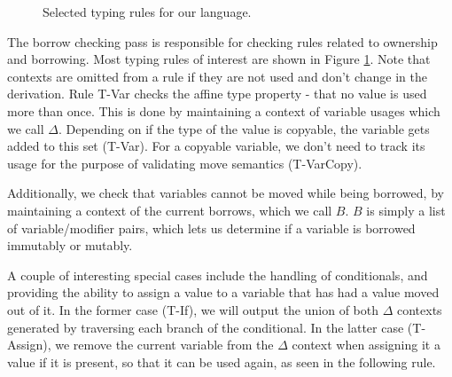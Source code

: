 \documentclass[letterpaper,11pt]{article}
\begin{document}
\begin{figure}
\begin{prooftree}
\end{prooftree}

\begin{prooftree}
\end{prooftree}

    \caption{Selected typing rules for our language.}
    \label{borrowrules}
\end{figure}

The borrow checking pass is responsible for checking rules related to ownership
and borrowing. Most typing rules of interest are shown in Figure \ref{borrowrules}. Note that
contexts are omitted from a rule if they are not used and don't change in the derivation.
Rule T-Var checks the affine type property - that no value is used more than once.
This is done by maintaining a context of variable usages which we call $\Delta$. Depending on if the type
of the value is copyable, the variable gets added to this set (T-Var). For a copyable variable,
we don't need to track its usage for the purpose of validating move semantics (T-VarCopy).

Additionally, we check that variables cannot be moved while being borrowed, by
maintaining a context of the current borrows, which we call $B$. $B$ is simply a list of variable/modifier
pairs, which lets us determine if a variable is borrowed immutably or mutably.

A couple of interesting special cases include the handling of conditionals,
and providing the ability to assign a value to a variable that has had a value
moved out of it. In the former case (T-If), we will output the union of both $\Delta$
contexts generated by traversing each branch of the conditional. In the latter case (T-Assign),
we remove the current variable from the $\Delta$ context when assigning it a value
if it is present, so that it can be used again, as seen in the following rule.
\end{document}
